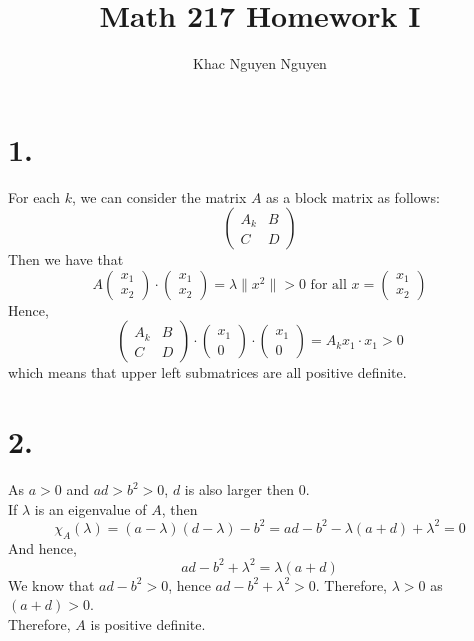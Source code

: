 \documentclass[11pt]{article}
\title{\textbf{Math 217 Homework I}}
\author{Khac Nguyen Nguyen}
\date{}
\begin{document}
\section*{1.}
For each $k$, we can consider the matrix $A$ as a block matrix as follows: 
\[
\begin{pmatrix}
    A_k & B \\
    C & D
\end{pmatrix}
\]
Then we have that 
\[
    A
    \begin{pmatrix}
    x_1 \\
    x_2
    \end{pmatrix}
    \cdot 
     \begin{pmatrix}
    x_1 \\
    x_2
    \end{pmatrix} = \lambda \|x^2\|
    > 0 \text { for all } 
    x = 
    \begin{pmatrix}
        x_1 \\
        x_2
    \end{pmatrix}
\]
Hence, 
\[
    \begin{pmatrix}
        A_k & B \\
        C & D 
    \end{pmatrix}
    \cdot 
    \begin{pmatrix}
        x_1 \\
        0
    \end{pmatrix}
    \cdot 
    \begin{pmatrix}
        x_1 \\
        0
    \end{pmatrix}
    = A_k x_1 \cdot x_1 > 0
\]
which means that upper left submatrices are all positive definite.
\pagebreak
\section*{2.}
As $a >0$ and $ad > b^2>0$, $d$ is also larger then 0. \\
If $\lambda$ is an eigenvalue of $A$, then\\
\[\chi_A(\lambda) = (a-\lambda)(d- \lambda) - b^2 = ad-b^2 - \lambda(a+d) + \lambda^2 = 0\]
And hence, 
\[
ad-b^2+\lambda^2 = \lambda(a+d)
\]
We know that $ad-b^2 >0$, hence $ad-b^2 + \lambda^2 >0$. Therefore, $\lambda > 0 $ as $(a+d) > 0$. \\
Therefore, $A$ is positive definite. \\
\pagebreak
\end{document}
